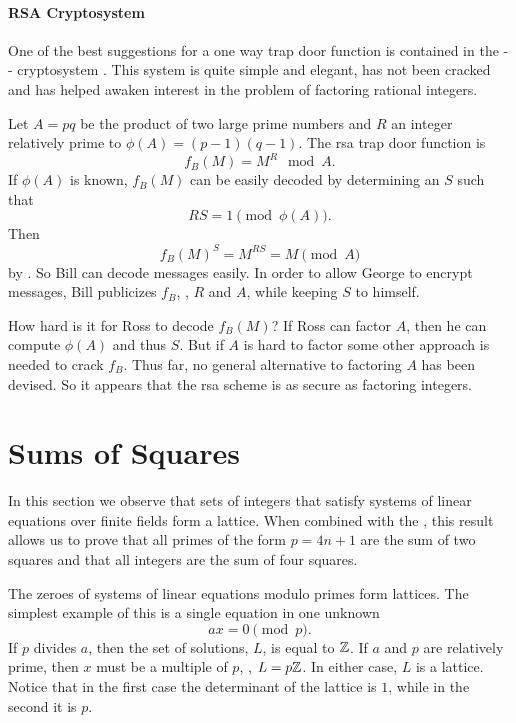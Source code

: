 \paragraph{RSA Cryptosystem}


One of the best suggestions for a one way trap door function is
contained in the {\Rivest}-{\Shamir}-{\Adleman} cryptosystem
\cite{Rivest1978-zd}.  This system is quite simple and elegant, has not
been cracked and has helped awaken interest in the problem of
factoring rational integers.

Let $A = pq$ be the product of two large prime numbers and $R$ an
integer relatively prime to $\phi(A) = (p-1)(q-1)$.  The {\sc rsa} trap door
function is
\[
f_B(M) = M^R \mod A.
\]
If $\phi(A)$ is known, $f_B(M)$ can be easily decoded by determining
an $S$ such that
\[
RS = 1 \pmod{\phi(A)}.
\]
Then
\[
f_B(M)^S = M^{RS} = M \pmod{A}
\]
by .  So Bill can decode messages easily.
In order to allow George to encrypt messages, Bill publicizes $f_B$,
\ie, $R$ and $A$, while keeping $S$ to himself.  

How hard is it for Ross to decode $f_B(M)$?  If Ross can factor $A$,
then he can compute $\phi(A)$ and thus $S$.  But if $A$ is hard to
factor some other approach is needed to crack $f_B$.  Thus far, no
general alternative to factoring $A$ has been devised.  So it appears
that the {\sc rsa} scheme is as secure as factoring integers.  


\section{Sums of Squares}
\label{FF:SumSquares:Sec}

In this section
 we observe that sets of integers that satisfy systems
of linear equations over finite fields form a lattice.  When combined
with the , this result allows us to prove
that all primes of the form $p= 4n+1$ are the sum of two squares and
that all integers are the sum of four squares.

The zeroes of systems of linear equations modulo primes form lattices.
The simplest example of this is a single equation in one unknown
\[
ax = 0 \pmod{p}.
\]
If $p$ divides $a$, then the set of solutions, $L$, is equal to $\mathbb{Z}$.  If $a$ and $p$ are relatively
prime, then $x$ must be a multiple of $p$, \ie, $L = p\mathbb{Z}$.  In either
case, $L$ is a lattice.  Notice that in the first case the determinant
of the lattice is $1$, while in the second it is $p$.  

